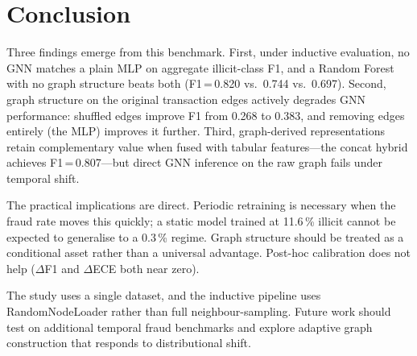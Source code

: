 \documentclass[runningheads]{llncs}
\begin{document}
\section{Conclusion}

Three findings emerge from this benchmark.  First, under inductive
evaluation, no GNN matches a plain MLP on aggregate illicit-class F1,
and a Random Forest with no graph structure beats both
(F1\,=\,0.820 vs.\ 0.744 vs.\ 0.697).  Second, graph structure on the
original transaction edges actively degrades GNN performance: shuffled
edges improve F1 from 0.268 to 0.383, and removing edges entirely
(the MLP) improves it further.  Third, graph-derived representations
retain complementary value when fused with tabular features---the concat
hybrid achieves F1\,=\,0.807---but direct GNN inference on the raw
graph fails under temporal shift.

The practical implications are direct.  Periodic retraining is necessary
when the fraud rate moves this quickly; a static model trained at
11.6\,\% illicit cannot be expected to generalise to a 0.3\,\% regime.
Graph structure should be treated as a conditional asset rather than a
universal advantage.  Post-hoc calibration does not help ($\Delta$F1
and $\Delta$ECE both near zero).

The study uses a single dataset, and the inductive pipeline uses
RandomNodeLoader rather than full neighbour-sampling.  Future work
should test on additional temporal fraud benchmarks and explore adaptive
graph construction that responds to distributional shift.

\FloatBarrier



\end{document}
